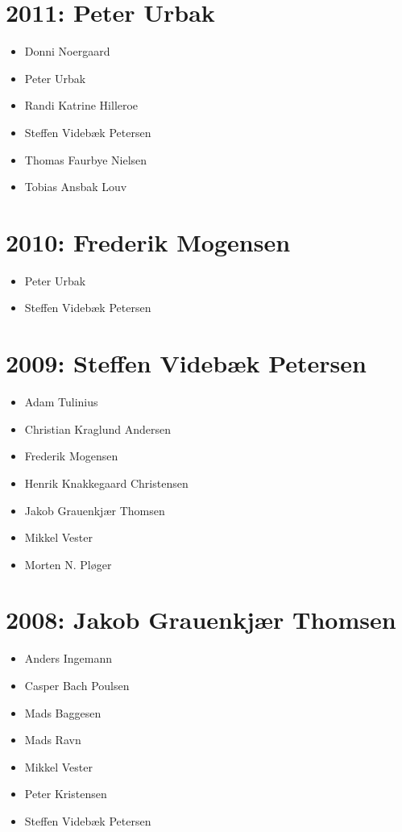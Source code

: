 \documentclass[article,oneside,a4paper]{memoir}
\begin{document}
\section*{2011: Peter Urbak}

\begin{itemize}
  \item Donni Noergaard
  \item Peter Urbak
  \item Randi Katrine Hilleroe
  \item Steffen Videbæk Petersen
  \item Thomas Faurbye Nielsen
  \item Tobias Ansbak Louv
\end{itemize}

\section*{2010: Frederik Mogensen}

\begin{itemize}
  \item Peter Urbak
  \item Steffen Videbæk Petersen
\end{itemize}

\section*{2009: Steffen Videbæk Petersen}

\begin{itemize}
  \item Adam Tulinius
  \item Christian Kraglund Andersen
  \item Frederik Mogensen
  \item Henrik Knakkegaard Christensen
  \item Jakob Grauenkjær Thomsen
  \item Mikkel Vester
  \item Morten N. Pløger
\end{itemize}

\section*{2008: Jakob Grauenkjær Thomsen}

\begin{itemize}
  \item Anders Ingemann
  \item Casper Bach Poulsen
  \item Mads Baggesen
  \item Mads Ravn
  \item Mikkel Vester
  \item Peter Kristensen
  \item Steffen Videbæk Petersen
\end{itemize}
\end{document}
